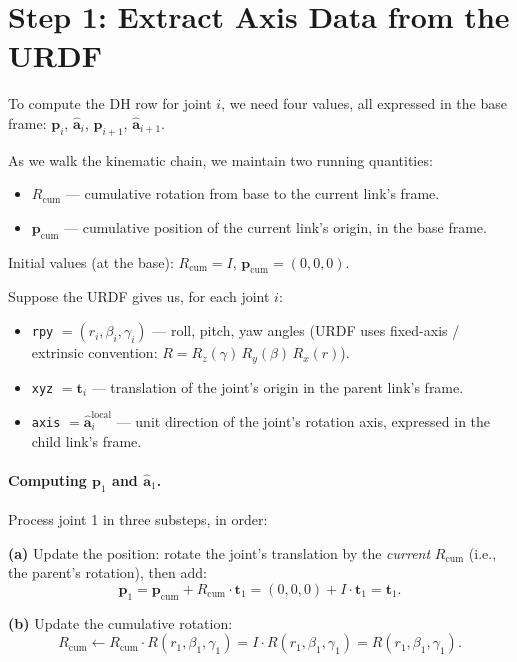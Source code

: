 \documentclass[11pt]{article}
\newcommand{\vect}[1]{\bm{#1}}
\newcommand{\unit}[1]{\hat{\bm{#1}}}
\begin{document}
\section{Step 1: Extract Axis Data from the URDF}

To compute the DH row for joint $i$, we need four values, all expressed in
the base frame: $\vect{p}_i$, $\unit{a}_i$, $\vect{p}_{i+1}$, $\unit{a}_{i+1}$.

As we walk the kinematic chain, we maintain two running quantities:
\begin{itemize}
  \item $R_{\mathrm{cum}}$ --- cumulative rotation from base to the current
        link's frame.
  \item $\vect{p}_{\mathrm{cum}}$ --- cumulative position of the current
        link's origin, in the base frame.
\end{itemize}
Initial values (at the base): $R_{\mathrm{cum}} = I$,
$\vect{p}_{\mathrm{cum}} = (0, 0, 0)$.

Suppose the URDF gives us, for each joint $i$:
\begin{itemize}
  \item \texttt{rpy} $= (r_i, \beta_i, \gamma_i)$ --- roll, pitch, yaw angles
        (URDF uses fixed-axis / extrinsic convention:
        $R = R_z(\gamma)\,R_y(\beta)\,R_x(r)$).
  \item \texttt{xyz} $= \vect{t}_i$ --- translation of the joint's origin in
        the parent link's frame.
  \item \texttt{axis} $= \unit{a}_i^{\mathrm{local}}$ --- unit direction of
        the joint's rotation axis, expressed in the child link's frame.
\end{itemize}

\paragraph{Computing $\vect{p}_1$ and $\unit{a}_1$.} Process joint 1 in
three substeps, in order:

\textbf{(a)} Update the position: rotate the joint's translation by the
\emph{current} $R_{\mathrm{cum}}$ (i.e., the parent's rotation), then add:
\[
  \vect{p}_1 = \vect{p}_{\mathrm{cum}} + R_{\mathrm{cum}} \cdot \vect{t}_1
             = (0, 0, 0) + I \cdot \vect{t}_1 = \vect{t}_1.
\]

\textbf{(b)} Update the cumulative rotation:
\[
  R_{\mathrm{cum}} \leftarrow R_{\mathrm{cum}} \cdot R(r_1, \beta_1, \gamma_1)
                            = I \cdot R(r_1, \beta_1, \gamma_1)
                            = R(r_1, \beta_1, \gamma_1).
\]
\end{document}
